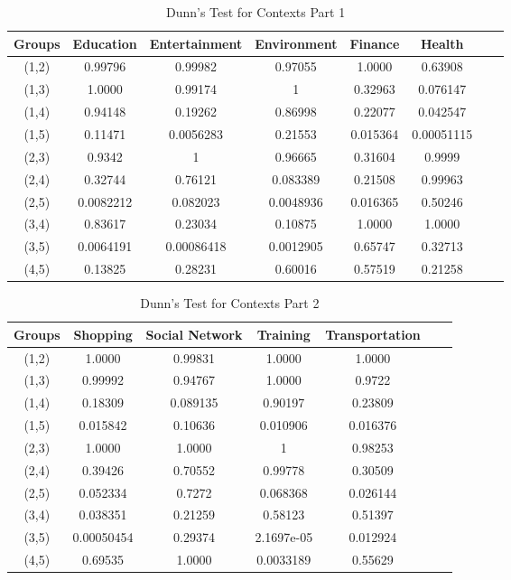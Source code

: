 \begin{table}[h!]
  \centering
  \caption{Dunn's Test for Contexts Part 1}
  \label{tab:dunn_c}
  \begin{tabular}{cccccccc}
    \toprule
     Groups & Education & Entertainment & Environment & Finance & Health  \\
    \midrule
    (1,2)&0.99796&0.99982&0.97055&1.0000&0.63908\\
(1,3)&1.0000&0.99174&1&0.32963&0.076147\\
(1,4)&0.94148&0.19262&0.86998&0.22077&0.042547\\
(1,5)&0.11471&0.0056283&0.21553&0.015364&0.00051115\\
(2,3)&0.9342&1&0.96665&0.31604&0.9999\\
(2,4)&0.32744&0.76121&0.083389&0.21508&0.99963\\
(2,5)&0.0082212&0.082023&0.0048936&0.016365&0.50246\\
(3,4)&0.83617&0.23034&0.10875&1.0000&1.0000\\
(3,5)&0.0064191&0.00086418&0.0012905&0.65747&0.32713\\
(4,5)&0.13825&0.28231&0.60016&0.57519&0.21258\\
    \bottomrule
  \end{tabular}
\end{table}

\begin{table}[h!]
  \centering
  \caption{Dunn's Test for Contexts Part 2}
  \label{tab:dunn_c1}
  \begin{tabular}{ccccccc}
    \toprule
     Groups & Shopping & Social Network & Training & Transportation  \\
    \midrule
(1,2) &1.0000&0.99831&1.0000&1.0000\\
(1,3)&0.99992&0.94767&1.0000&0.9722\\
(1,4)&0.18309&0.089135&0.90197&0.23809\\
(1,5)&0.015842&0.10636&0.010906&0.016376\\
(2,3)&1.0000&1.0000&1&0.98253\\
(2,4)&0.39426&0.70552&0.99778&0.30509\\
(2,5)&0.052334&0.7272&0.068368&0.026144\\
(3,4)&0.038351&0.21259&0.58123&0.51397\\
(3,5)&0.00050454&0.29374&2.1697e-05&0.012924\\
(4,5)&0.69535&1.0000&0.0033189&0.55629\\
\bottomrule
  \end{tabular}
\end{table} 


